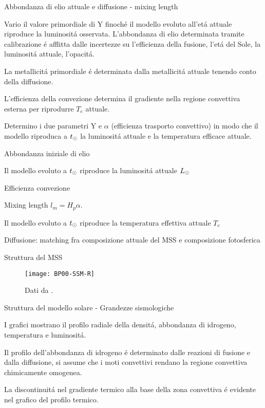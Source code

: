 \documentclass[10pt,xcolor={usenames},fleqn,mathserif,serif]{beamer}
\begin{document}
\begin{wordonframe}{Abbondanza di elio attuale e diffusione - mixing length}

Vario il valore primordiale di Y finoch\'e il modello evoluto all'et\'a attuale riproduce la luminosit\'a osservata. L'abbondanza di elio determinata tramite calibrazione \'e afflitta dalle incertezze su l'efficienza della fusione, l'et\'a del Sole, la luminosit\'a attuale, l'opacit\'a.

La metallicit\'a primordiale \'e determinata dalla metallicit\'a attuale tenendo conto della diffusione.

L'efficienza della convezione determina il gradiente nella regione convettiva esterna per riprodurre $T_e$ attuale.

Determino i due parametri Y e $\alpha$ (efficienza trasporto convettivo) in modo che il modello riproduca a $t_{\odot}{}$ la luminosit\'a attuale e la temperatura efficace attuale.

\begin{block}{Abbondanza iniziale di elio}

Il modello evoluto a $t_{\odot}{}$ riproduce la luminosit\'a attuale $L_{\odot}{}$

\end{block}

\begin{block}{Efficienza convezione}

Mixing length $l_m=H_p\alpha$.

Il modello evoluto a $t_{\odot}{}$ riproduce la temperatura effettiva attuale $T_e$

\end{block}

\begin{block}{Diffusione: matching fra composizione attuale del MSS e composizione fotosferica}

\end{block}

\end{wordonframe}

\begin{frame}{Struttura del MSS}

\begin{figure}[!h]
\texttt{[image: BP00-SSM-R]}
\caption{Dati da \cite{BP2000}.}
\end{figure}

\end{frame}

\begin{wordonframe}{Struttura del modello solare - Grandezze sismologiche}

I grafici mostrano il profilo radiale della densit\'a, abbondanza di idrogeno, temperatura e luminosit\'a.

Il profilo dell'abbondanza di idrogeno \'e determinato dalle reazioni di fusione e dalla diffusione, si assume che i moti convettivi rendano la regione convettiva chimicamente omogenea.

La discontinuit\'a nel gradiente termico alla base della zona convettiva \'e evidente nel grafico del profilo termico.

\end{wordonframe}
\end{document}
